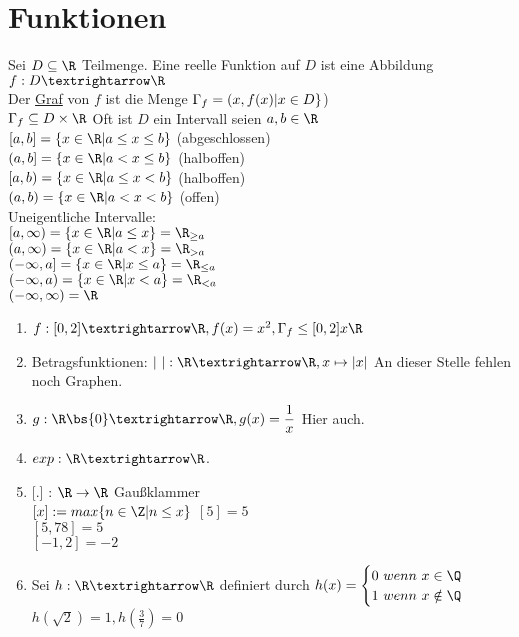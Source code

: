 \section*{Funktionen}
Sei $D\subseteq\R$ Teilmenge. Eine reelle Funktion auf $D$ ist eine Abbildung $f:D→\R$\\
%
Der \underline{Graf} von $f$ ist die Menge $\Gamma_f = \/(x, f(x) | x \in D \}$) \\
$ \Gamma_f \subseteq D \times \R$ 
%
\bem Oft ist $D$ ein Intervall
%
seien $a, b \in \R$ \\
$[a, b] = \{x \in \R| a \leq x \leq b\}$ (abgeschlossen)\\
$(a, b] = \{x \in \R| a < x \leq b\}$ (halboffen)\\
$[a, b) = \{x \in \R| a \leq x < b\}$ (halboffen)\\ %
$(a, b) = \{x \in \R| a < x < b\}$ (offen)\\
%
Uneigentliche Intervalle: \\
$[a, \infty) = \{x \in \R | a \leq x\} = \R_{\geq a}$\\
$(a, \infty) = \{x \in \R | a < x\} = \R_{> a}$\\
$(- \infty, a] = \{x \in \R | x \leq a\} = \R_{\leq a}$\\
$(- \infty, a) = \{x \in \R | x < a\} = \R_{< a}$\\
$(- \infty, \infty) = \R$\\
%
\begin{enumerate}
\item{$f:[0,2]→\R, f(x)=x^2, \Gamma_f \leq [0,2] x\R$
%
}
\item{Betragsfunktionen: $|\ |: \R→\R, x\mapsto|x|$
}
An dieser Stelle fehlen noch Graphen.
\item{$g:\R\bs\{0\}→\R, g(x)=\dfrac{1}{x}$
Hier auch.
}
\item{$exp:\R→\R$.}
\item{[.] : $\R \to \R$ Gaußklammer\\
$[x] := max\{n \in \Z | n \leq x \}$
\bsp
$[5] = 5$\\
$[5,78] = 5$\\
$[-1,2] = -2$}
\item{Sei $h:\R→\R$ definiert durch $h(x)=\begin{cases}0\ wenn\ x\in\Q\\ 1\ wenn\ x\notin\Q\end{cases}$\\
$h(\sqrt{2}) = 1, h (\frac{3}{7}) = 0$}
\end{enumerate}

